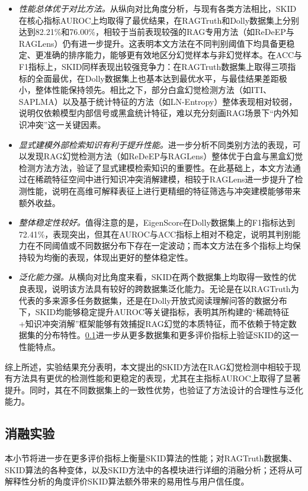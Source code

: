 \begin{itemize}
  \item \emph{性能总体优于对比方法。}从纵向对比角度分析，与现有各类方法相比，SKID在核心指标AUROC上均取得了最优结果，在RAGTruth和Dolly数据集上分别达到82.21\%和76.00\%，相较于当前表现较强的RAG专用方法（如ReDeEP与RAGLens）仍有进一步提升。这表明本文方法在不同判别阈值下均具备更稳定、更准确的排序能力，能够更有效地区分幻觉样本与非幻觉样本。在ACC与F1指标上，SKID同样表现出较强竞争力：在RAGTruth数据集上取得三项指标的全面最优，在Dolly数据集上也基本达到最优水平，与最佳结果差距极小，整体性能保持领先。相比之下，部分白盒幻觉检测方法（如ITI、SAPLMA）以及基于统计特征的方法（如LN-Entropy）整体表现相对较弱，说明仅依赖模型内部信号或黑盒统计特征，难以充分刻画RAG场景下“内外知识冲突”这一关键因素。
  \item \emph{显式建模外部检索知识有利于提升性能。}进一步分析不同类别方法的表现，可以发现RAG幻觉检测方法（如ReDeEP与RAGLens）整体优于白盒与黑盒幻觉检测方法方法，验证了显式建模检索知识的重要性。在此基础上，本文方法通过在稀疏特征空间中进行知识冲突消解建模，相较于RAGLens进一步提升了检测性能，说明在高维可解释表征上进行更精细的特征筛选与冲突建模能够带来额外收益。
  \item \emph{整体稳定性较好。}值得注意的是，EigenScore在Dolly数据集上的F1指标达到72.41\%，表现突出，但其在AUROC与ACC指标上相对不稳定，说明其判别能力在不同阈值或不同数据分布下存在一定波动；而本文方法在多个指标上均保持较为均衡的表现，体现出更好的整体稳定性。
  \item \emph{泛化能力强。}从横向对比角度来看，SKID在两个数据集上均取得一致性的优良表现，说明该方法具有较好的跨数据集泛化能力。无论是在以RAGTruth为代表的多来源多任务数据集，还是在Dolly开放式阅读理解问答的数据分布下，SKID均能够稳定提升AUROC等关键指标，表明其所构建的“稀疏特征+知识冲突消解”框架能够有效捕捉RAG幻觉的本质特征，而不依赖于特定数据集的分布特性。\ref{subsec:skid_ablation}进一步从更多数据集和更多评价指标上验证SKID的这一性能特点。
\end{itemize}

综上所述，实验结果充分表明，本文提出的SKID方法在RAG幻觉检测中相较于现有方法具有更优的检测性能和更稳定的表现，尤其在主指标AUROC上取得了显著提升。同时，其在不同数据集上的一致性优势，也验证了方法设计的合理性与泛化能力。

\subsection{消融实验}\label{subsec:skid_ablation}

本小节将进一步在更多评价指标上衡量SKID算法的性能；对RAGTruth数据集、SKID算法的各种变体，以及SKID方法中的各模块进行详细的消融分析；还将从可解释性分析的角度评价SKID算法额外带来的易用性与用户信任度。

